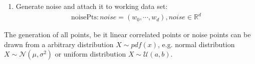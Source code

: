 \begin{enumerate}[resume]
\item Generate noise and attach it to working data set:
\begin{align}
    \text{noisePts}: noise = (w_0, \cdots, w_d), noise \in \mathbb{R}^{d}
\end{align}
\end{enumerate}

The generation of all points, be it linear correlated points or noise points can be drawn from a arbitrary distribution $X \sim pdf(x)$, e.g. normal distribution $X \sim \mathcal{N}(\mu,\sigma^2)$ or uniform distribution $X \sim \mathcal{U}(a,b)$.

